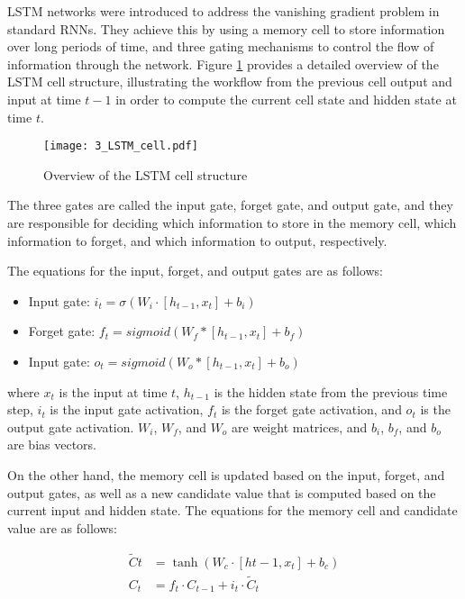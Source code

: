 LSTM networks were introduced to address the vanishing gradient problem in standard RNNs. They achieve this by using a memory cell to store information over long periods of time, and three gating mechanisms to control the flow of information through the network. Figure \ref{fig:3_LSTM} provides a detailed overview of the LSTM cell structure, illustrating the workflow from the previous cell output and input at time $t-1$ in order to compute the current cell state and hidden state at time $t$.

\begin{figure}[h]
	\centering
	\texttt{[image: 3\_LSTM\_cell.pdf]}
	\caption{Overview of the LSTM cell structure}
	\label{fig:3_LSTM}
\end{figure}

The three gates are called the input gate, forget gate, and output gate, and they are responsible for deciding which information to store in the memory cell, which information to forget, and which information to output, respectively.

The equations for the input, forget, and output gates are as follows:

\begin{itemize}
	\item Input gate: $i_t = \sigma(W_i \cdot [h_{t-1}, x_t] + b_i)$
	\item Forget gate: $f_t = sigmoid(W_f * [h_{t-1}, x_t] + b_f)$
	\item Input gate: $o_t = sigmoid(W_o * [h_{t-1}, x_t] + b_o)$
\end{itemize}

where $x_t$ is the input at time $t$, $h_{t-1}$ is the hidden state from the previous time step, $i_t$ is the input gate activation, $f_t$ is the forget gate activation, and $o_t$ is the output gate activation. $W_i$, $W_f$, and $W_o$ are weight matrices, and $b_i$, $b_f$, and $b_o$ are bias vectors.

On the other hand, the memory cell is updated based on the input, forget, and output gates, as well as a new candidate value that is computed based on the current input and hidden state. The equations for the memory cell and candidate value are as follows:

\begin{equation}
\begin{split}
		\tilde{C}t &= \tanh(W_c \cdot [h{t-1}, x_t] + b_c) \\
		C_t &= f_t \cdot C_{t-1} + i_t \cdot \tilde{C}_t 
\end{split}
\end{equation}


